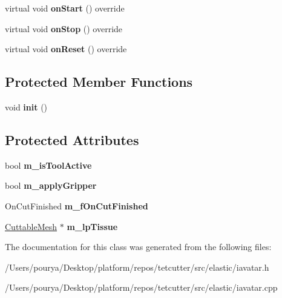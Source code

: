 \begin{DoxyCompactItemize}
\item 
\hypertarget{classps_1_1elastic_1_1IAvatar_a1591eb04ef1027916f5c4d14c2d23d2e}{}virtual void {\bfseries on\+Start} () override\label{classps_1_1elastic_1_1IAvatar_a1591eb04ef1027916f5c4d14c2d23d2e}

\item 
\hypertarget{classps_1_1elastic_1_1IAvatar_ae4e4ce7bd3e980be0d8aeef5e9d1c6be}{}virtual void {\bfseries on\+Stop} () override\label{classps_1_1elastic_1_1IAvatar_ae4e4ce7bd3e980be0d8aeef5e9d1c6be}

\item 
\hypertarget{classps_1_1elastic_1_1IAvatar_a5493dfe996c2a72c6f623214a4296887}{}virtual void {\bfseries on\+Reset} () override\label{classps_1_1elastic_1_1IAvatar_a5493dfe996c2a72c6f623214a4296887}

\end{DoxyCompactItemize}
\subsection*{Protected Member Functions}
\begin{DoxyCompactItemize}
\item 
\hypertarget{classps_1_1elastic_1_1IAvatar_ac9d23b648ec205f7ad741d4f59bf72f5}{}void {\bfseries init} ()\label{classps_1_1elastic_1_1IAvatar_ac9d23b648ec205f7ad741d4f59bf72f5}

\end{DoxyCompactItemize}
\subsection*{Protected Attributes}
\begin{DoxyCompactItemize}
\item 
\hypertarget{classps_1_1elastic_1_1IAvatar_a43b7bc51b57ff45402b0b578cff62aa1}{}bool {\bfseries m\+\_\+is\+Tool\+Active}\label{classps_1_1elastic_1_1IAvatar_a43b7bc51b57ff45402b0b578cff62aa1}

\item 
\hypertarget{classps_1_1elastic_1_1IAvatar_a646c4b11d23e36ec4d37164e584a6b2c}{}bool {\bfseries m\+\_\+apply\+Gripper}\label{classps_1_1elastic_1_1IAvatar_a646c4b11d23e36ec4d37164e584a6b2c}

\item 
\hypertarget{classps_1_1elastic_1_1IAvatar_a3a1e8ca01e6c15ad5e7d72f408587361}{}On\+Cut\+Finished {\bfseries m\+\_\+f\+On\+Cut\+Finished}\label{classps_1_1elastic_1_1IAvatar_a3a1e8ca01e6c15ad5e7d72f408587361}

\item 
\hypertarget{classps_1_1elastic_1_1IAvatar_aa366076ebb230205c1c068539cde0e4a}{}\hyperlink{classps_1_1elastic_1_1CuttableMesh}{Cuttable\+Mesh} $\ast$ {\bfseries m\+\_\+lp\+Tissue}\label{classps_1_1elastic_1_1IAvatar_aa366076ebb230205c1c068539cde0e4a}

\end{DoxyCompactItemize}


The documentation for this class was generated from the following files\+:\begin{DoxyCompactItemize}
\item 
/\+Users/pourya/\+Desktop/platform/repos/tetcutter/src/elastic/iavatar.\+h\item 
/\+Users/pourya/\+Desktop/platform/repos/tetcutter/src/elastic/iavatar.\+cpp\end{DoxyCompactItemize}
